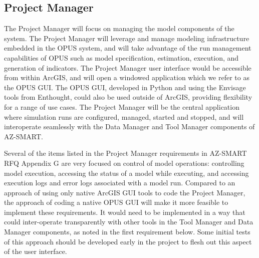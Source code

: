 


\subsection{Project Manager}

The Project Manager will focus on managing the model components of the
system. The Project Manager will leverage and manage modeling infrastructure
embedded in the OPUS system, and will take advantage of the run management
capabilities of OPUS such as model specification, estimation, execution, and
generation of indicators.  The Project Manager user interface would be
accessible from within ArcGIS, and will open a windowed application which
we refer to as the OPUS GUI.  The OPUS GUI, developed in Python and using
the Envisage tools from Enthought, could also be used outside of ArcGIS,
providing flexibility for a range of use cases.  The Project Manager will
be the central application where simulation runs are configured, managed,
started and stopped, and will interoperate seamlessly with the Data Manager
and Tool Manager components of AZ-SMART.

Several of the items listed in the Project Manager requirements in AZ-SMART
RFQ Appendix G are very focused on control of model operations: controlling
model execution, accessing the status of a model while executing, and
accessing execution logs and error logs associated with a model run.
Compared to an approach of using only native ArcGIS GUI tools to code
the Project Manager, the approach of coding a native OPUS GUI will make
it more feasible to implement these requirements.  It would need to be
implemented in a way that could inter-operate transparently with other
tools in the Tool Manager and Data Manager components, as noted in the
first requirement below. Some initial tests of this approach should be
developed early in the project to flesh out this aspect of the user
interface.
